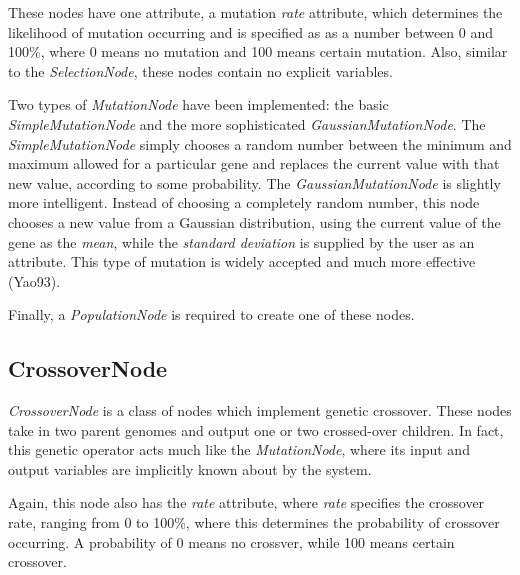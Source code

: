 \documentclass[10pt, notitlepage, a4paper]{article}
\begin{document}
These nodes have one attribute, a mutation {\it rate} attribute, which determines the likelihood of mutation occurring and is specified as as a number between 0 and 100\%, where 0 means no mutation and 100 means certain mutation. Also, similar to the {\it SelectionNode}, these nodes contain no explicit variables.

Two types of {\it MutationNode} have been implemented: the basic {\it SimpleMutationNode} and the more sophisticated {\it GaussianMutationNode}. The {\it SimpleMutationNode} simply chooses a random number between the minimum and maximum allowed for a particular gene and replaces the current value with that new value, according to some probability. The {\it GaussianMutationNode} is slightly more intelligent. Instead of choosing a completely random number, this node chooses a new value from a Gaussian distribution, using the current value of the gene as the {\it mean}, while the {\it standard deviation} is supplied by the user as an attribute. This type of mutation is widely accepted and much more effective (Yao93).

Finally, a {\it PopulationNode} is required to create one of these nodes.

\subsection{CrossoverNode}
{\it CrossoverNode} is a class of nodes which implement genetic crossover. These nodes take in two parent genomes and output one or two crossed-over children. In fact, this genetic operator acts much like the {\it MutationNode}, where its input and output variables are implicitly known about by the system.

Again, this node also has the {\it rate} attribute, where {\it rate} specifies the crossover rate, ranging from 0 to 100\%, where this determines the probability of crossover occurring. A probability of 0 means no crossver, while 100 means certain crossover.
\end{document}
